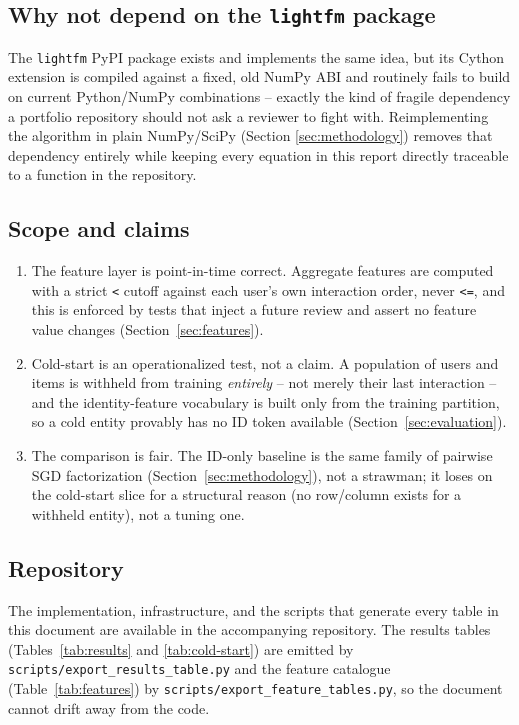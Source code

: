 \subsection{Why not depend on the \texttt{lightfm} package}

The \texttt{lightfm} PyPI package exists and implements the same idea, but
its Cython extension is compiled against a fixed, old NumPy ABI and routinely
fails to build on current Python/NumPy combinations -- exactly the kind of
fragile dependency a portfolio repository should not ask a reviewer to fight
with. Reimplementing the algorithm in plain NumPy/SciPy (Section
\ref{sec:methodology}) removes that dependency entirely while keeping every
equation in this report directly traceable to a function in the
repository.

\subsection{Scope and claims}

\begin{enumerate}
  \item The feature layer is point-in-time correct. Aggregate features are
        computed with a strict \texttt{<} cutoff against each user's own
        interaction order, never \texttt{<=}, and this is enforced by tests
        that inject a future review and assert no feature value changes
        (Section~\ref{sec:features}).
  \item Cold-start is an operationalized test, not a claim. A population of
        users and items is withheld from training \emph{entirely} -- not
        merely their last interaction -- and the identity-feature vocabulary
        is built only from the training partition, so a cold entity provably
        has no ID token available (Section~\ref{sec:evaluation}).
  \item The comparison is fair. The ID-only baseline is the same family of
        pairwise SGD factorization (Section~\ref{sec:methodology}), not a
        strawman; it loses on the cold-start slice for a structural reason
        (no row/column exists for a withheld entity), not a tuning one.
\end{enumerate}

\subsection{Repository}

The implementation, infrastructure, and the scripts that generate every
table in this document are available in the accompanying repository. The
results tables (Tables~\ref{tab:results} and \ref{tab:cold-start}) are
emitted by \texttt{scripts/export\_results\_table.py} and the feature
catalogue (Table~\ref{tab:features}) by
\texttt{scripts/export\_feature\_tables.py}, so the document cannot drift
away from the code.
